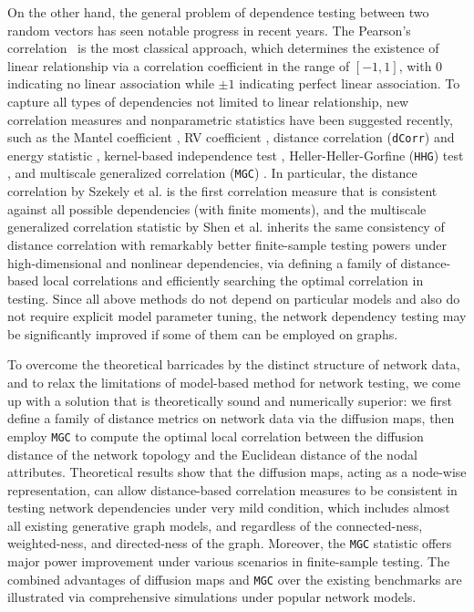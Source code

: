 \documentclass[11pt]{article}
\theoremstyle{definition}
\begin{document}
On the other hand, the general problem of dependence testing between two random vectors has seen notable progress in recent years. The Pearson's correlation~\cite{Pearson1895} is the most classical approach, which determines the existence of linear relationship via a correlation coefficient in the range of $[-1,1]$, with $0$ indicating no linear association while $\pm 1$ indicating perfect linear association. To capture all types of dependencies not limited to linear relationship, new correlation measures and nonparametric statistics have been suggested recently, such as the Mantel coefficient \cite{mantel1967}, RV coefficient \cite{RobertEscoufier1976}, distance correlation (\texttt{dCorr}) and energy statistic \cite{szekely2007measuring,szekelyRizzo2013a, RizzoSzekely2016}, kernel-based independence test \cite{GrettonGyorfi2010}, Heller-Heller-Gorfine (\texttt{HHG}) test \cite{HellerGorfine2013,heller2016consistent}, and multiscale generalized correlation (\texttt{MGC}) \cite{shen2016discovering}. In particular, the distance correlation by Szekely et al. \cite{szekely2007measuring} is the first correlation measure that is consistent against all possible dependencies (with finite moments), and the multiscale generalized correlation statistic by Shen et al. \cite{shen2016discovering} inherits the same consistency of distance correlation with remarkably better finite-sample testing powers under high-dimensional and nonlinear dependencies, via defining a family of distance-based local correlations and efficiently searching the optimal correlation in testing. Since all above methods do not depend on particular models and also do not require explicit model parameter tuning, the network dependency testing may be significantly improved if some of them can be employed on graphs.

To overcome the theoretical barricades by the distinct structure of network data, and to relax the limitations of model-based method for network testing, we come up with a solution that is theoretically sound and numerically superior: we first define a family of distance metrics on network data via the diffusion maps, then employ \texttt{MGC} to compute the optimal local correlation between the diffusion distance of the network topology and the Euclidean distance of the nodal attributes. Theoretical results show that the diffusion maps, acting as a node-wise representation, can allow distance-based correlation measures to be consistent in testing network dependencies under very mild condition, which includes almost all existing generative graph models, and regardless of the connected-ness, weighted-ness, and directed-ness of the graph. Moreover, the \texttt{MGC} statistic offers major power improvement under various scenarios in finite-sample testing. The combined advantages of diffusion maps and \texttt{MGC} over the existing benchmarks are illustrated via comprehensive simulations under popular network models.
\end{document}
